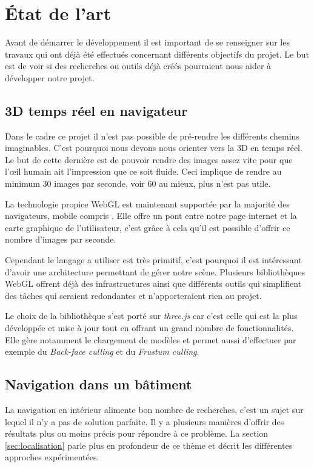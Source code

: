 \section{État de l'art}
Avant de démarrer le développement il est important de se renseigner sur les travaux qui ont déjà été effectués concernant différents objectifs du projet. Le but est de voir si des recherches ou outils déjà créés pourraient nous aider à développer notre projet.


\subsection{3D temps réel en navigateur}
Dans le cadre ce projet il n'est pas possible de pré-rendre les différents chemins imaginables. C'est pourquoi nous devons nous orienter vers la 3D en temps réel. Le but de cette dernière est de pouvoir rendre des images assez vite pour que l'œil humain ait l'impression que ce soit fluide. Ceci implique de rendre au minimum 30 images par seconde, voir 60 au mieux, plus n'est pas utile.

La technologie propice WebGL est maintenant supportée par la majorité des navigateurs, mobile compris \cite{caniuse-webgl}. Elle offre un pont entre notre page internet et la carte graphique de l'utilisateur, c'est grâce à cela qu'il est possible d'offrir ce nombre d'images par seconde. 

Cependant le langage a utiliser est très primitif, c'est pourquoi il est intéressant d'avoir une architecture permettant de gérer notre scène. Plusieurs bibliothèques WebGL offrent déjà des infrastructures ainsi que différents outils qui simplifient des tâches qui seraient redondantes et n'apporteraient rien au projet.

Le choix de la bibliothèque s'est porté sur \emph{three.js}\cite{threejs-website} car c'est celle qui est la plus développée et mise à jour tout en offrant un grand nombre de fonctionnalités. Elle gère notamment le chargement de modèles et permet aussi d'effectuer par exemple du \textit{Back-face culling} et du \textit{Frustum culling}\cite{wiki-HiddenSurfaceDetermination}.


\subsection{Navigation dans un bâtiment}
La navigation en intérieur alimente bon nombre de recherches, c'est un sujet sur lequel il n'y a pas de solution parfaite. Il y a plusieurs manières d'offrir des résultats plus ou moins précis pour répondre à ce problème. La section \ref{sec:localisation} parle plus en profondeur de ce thème et décrit les différentes approches expérimentées.


